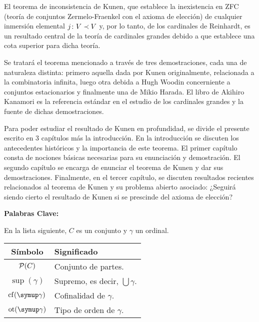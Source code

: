 El teorema de inconsistencia de Kunen, que establece la inexistencia en
ZFC (teoría de conjuntos Zermelo-Fraenkel con el axioma de elección)
de cualquier inmersión elemental $j\colon V\prec V$ y, por lo tanto, de los cardinales
de Reinhardt, es un resultado central de la teoría de cardinales grandes
debido a que establece una cota superior para dicha teoría.

Se tratará el teorema mencionado a través de tres demostraciones, cada una de naturaleza
distinta: primero aquella dada por Kunen originalmente, relacionada a la combinatoria infinita,
luego otra debida a Hugh Woodin concerniente a conjuntos estacionarios y finalmente una de
Mikio Harada. El libro de Akihiro Kanamori \autocite{cohen_independence_1964} es la referencia
estándar en el estudio de los cardinales grandes y la fuente de dichas demostraciones.

Para poder estudiar el resultado de Kunen en profundidad,
se divide el presente escrito en 3 capítulos más la introducción.
En la introducción se discuten los antecedentes históricos y la importancia
de este teorema.
El primer capítulo consta de nociones básicas necesarias para su enunciación y demostración.
El segundo capítulo se encarga de enunciar el teorema de Kunen y dar sus demostraciones.
Finalmente, en el tercer capítulo, se discuten resultados recientes relacionados al teorema de Kunen
y su problema abierto asociado:
¿Seguirá siendo cierto el resultado de Kunen si se prescinde del axioma de elección?

\vspace{\fill}

\textbf{Palabras Clave:}
\fi
\ifdedicatoria\newpage
{}
\fi
\ifagradecimientos\newpage
{}
\fi
\iflistas
{}

En la lista siguiente, $C$ es un conjunto y $\gamma$ un ordinal.

\begin{center}
    \begin{tabular}{cl}
        Símbolo & Significado \\
        \hline\noalign{\smallskip}
        $\pwset{C}$ & Conjunto de partes.\\
        $\sup(\gamma)$ & Supremo, es decir, $\bigcup \gamma$.\\
        $\cf(\gamma)$ & Cofinalidad de $\gamma$.\\
        $\ot(\gamma)$ & Tipo de orden de $\gamma$.
    \end{tabular}
\end{center}

